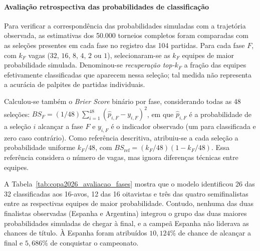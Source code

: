 \documentclass[12pt]{article}
\begin{document}
\paragraph{Avaliação retrospectiva das probabilidades de classificação}
Para verificar a correspondência das probabilidades simuladas com a trajetória observada, as estimativas dos 50.000 torneios completos foram comparadas com as seleções presentes em cada fase no registro das 104 partidas. Para cada fase $F$, com $k_F$ vagas ($32$, $16$, $8$, $4$, $2$ ou $1$), selecionaram-se as $k_F$ equipes de maior probabilidade simulada. Denominou-se \textit{recuperação top-$k_F$} a fração das equipes efetivamente classificadas que aparecem nessa seleção; tal medida não representa a acurácia de palpites de partidas individuais.

Calculou-se também o \textit{Brier Score} binário por fase, considerando todas as 48 seleções: $BS_F=(1/48)\sum_{i=1}^{48}(\widehat p_{i,F}-y_{i,F})^2$, em que $\widehat p_{i,F}$ é a probabilidade de a seleção $i$ alcançar a fase $F$ e $y_{i,F}$ é o indicador observado (um para classificada e zero caso contrário). Como referência descritiva, atribuiu-se a cada seleção a probabilidade uniforme $k_F/48$, com $BS_{\mathrm{ref}}=(k_F/48)(1-k_F/48)$. Essa referência considera o número de vagas, mas ignora diferenças técnicas entre equipes.

\begin{table}[ht]
\centering
\caption{Avaliação retrospectiva do avanço por fase: recuperação top-$k_F$ e Brier Score binário.}
\label{tab:copa2026_avaliacao_fases}
\end{table}

A Tabela~\ref{tab:copa2026_avaliacao_fases} mostra que o modelo identificou 26 das 32 classificadas aos 16-avos, 12 das 16 oitavistas e três das quatro semifinalistas entre as respectivas equipes de maior probabilidade. Contudo, nenhuma das duas finalistas observadas (Espanha e Argentina) integrou o grupo das duas maiores probabilidades simuladas de chegar à final, e a campeã Espanha não liderava as chances de título. À Espanha foram atribuídos $10,124\%$ de chance de alcançar a final e $5,686\%$ de conquistar o campeonato.
\end{document}
